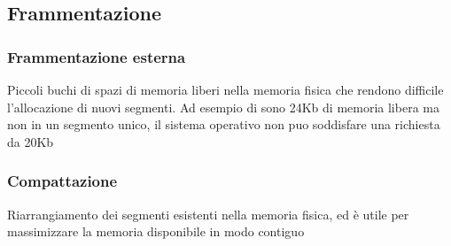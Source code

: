\documentclass{article}
\begin{document}
\subsection{Frammentazione}
\subsubsection{Frammentazione esterna}
Piccoli buchi di spazi di memoria liberi nella memoria fisica che rendono difficile l'allocazione di nuovi segmenti. Ad esempio di sono 24Kb di memoria libera ma non in un segmento unico, il sistema operativo non puo soddisfare una richiesta da 20Kb
\subsubsection{Compattazione}
Riarrangiamento dei segmenti esistenti nella memoria fisica, ed è utile per massimizzare la memoria disponibile in modo contiguo
\end{document}
